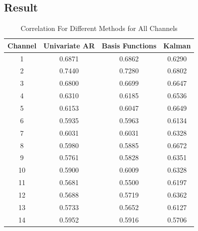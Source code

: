 \subsection{Result}
\begin{table}[h!]
	\centering
	\begin{tabular}{|| c c c c ||} 
		\hline
		Channel & Univariate AR & Basis Functions & Kalman \\ [0.5ex] 
		\hline\hline
		1 & 0.6871 & 0.6862 & 0.6290 \\ 
		2 & 0.7440 & 0.7280 & 0.6802 \\
		3 & 0.6800 & 0.6699 & 0.6647 \\
		4 & 0.6310 & 0.6185 & 0.6536\\
		5 & 0.6153 & 0.6047 & 0.6649 \\
		6 & 0.5935 & 0.5963 & 0.6134 \\ 
		7 & 0.6031 & 0.6031 & 0.6328 \\ 
		8 & 0.5980 & 0.5885 & 0.6672 \\ 
		9 & 0.5761 & 0.5828 & 0.6351 \\ 
		10 & 0.5900 & 0.6009 & 0.6328 \\ 
		11 & 0.5681 & 0.5500 & 0.6197 \\ 
		12 & 0.5688 & 0.5719 & 0.6362 \\ 
		13 & 0.5733 & 0.5652 & 0.6127 \\ 
		14 & 0.5952 & 0.5916 & 0.5706 \\ 
		\hline
		\end{tabular}
		\caption{Correlation For Different Methods for All Channels}
		\label{table:1}
\end{table}